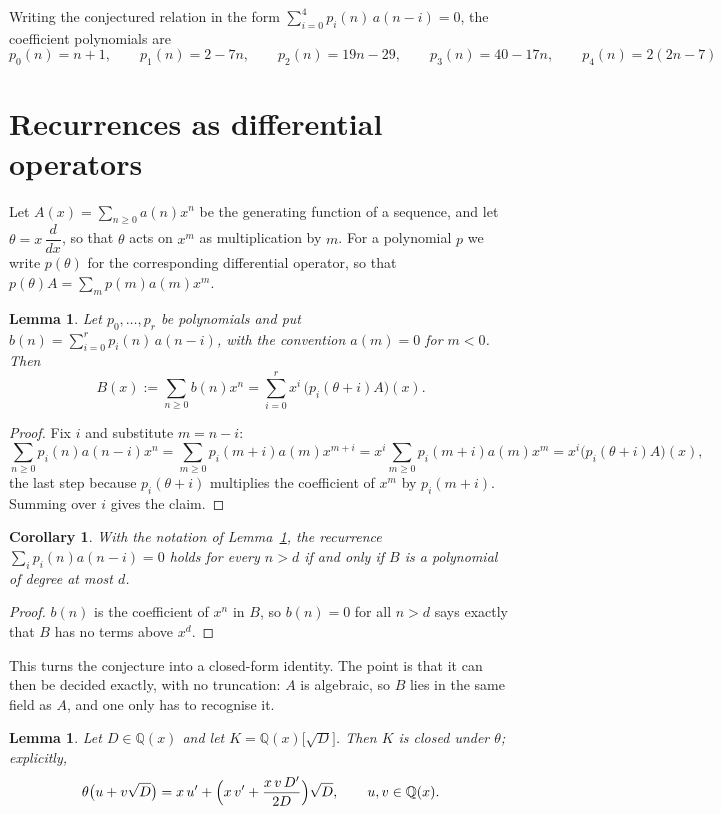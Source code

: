 \documentclass[11pt,a4paper]{article}
\theoremstyle{plain}
\newtheorem{lemma}[theorem]{Lemma}
\newtheorem{corollary}[theorem]{Corollary}
\theoremstyle{definition}
\begin{document}
Writing the conjectured relation in the form $\sum_{i=0}^{4}p_{i}(n)\,a(n-i)=0$,
the coefficient polynomials are
\[
p_{0}(n)=n + 1,\qquad p_{1}(n)=2 - 7 n,\qquad p_{2}(n)=19 n - 29,\qquad p_{3}(n)=40 - 17 n,\qquad p_{4}(n)=2 \left(2 n - 7\right)
\]

\section{Recurrences as differential operators}

Let $A(x)=\sum_{n\ge0}a(n)x^{n}$ be the generating function of a sequence, and let
$\theta=x\,\dfrac{d}{dx}$, so that $\theta$ acts on $x^{m}$ as multiplication by $m$. For a
polynomial $p$ we write $p(\theta)$ for the corresponding differential operator, so that
$p(\theta)A=\sum_{m}p(m)a(m)x^{m}$.

\begin{lemma}\label{lem:transfer}
Let $p_{0},\dots,p_{r}$ be polynomials and put $b(n)=\sum_{i=0}^{r}p_{i}(n)\,a(n-i)$, with
the convention $a(m)=0$ for $m<0$. Then
\[
B(x):=\sum_{n\ge0}b(n)x^{n}=\sum_{i=0}^{r}x^{i}\,\bigl(p_{i}(\theta+i)A\bigr)(x).
\]
\end{lemma}

\begin{proof}
Fix $i$ and substitute $m=n-i$:
\[
\sum_{n\ge0}p_{i}(n)a(n-i)x^{n}=\sum_{m\ge0}p_{i}(m+i)a(m)x^{m+i}
=x^{i}\sum_{m\ge0}p_{i}(m+i)a(m)x^{m}=x^{i}\bigl(p_{i}(\theta+i)A\bigr)(x),
\]
the last step because $p_{i}(\theta+i)$ multiplies the coefficient of $x^{m}$ by
$p_{i}(m+i)$. Summing over $i$ gives the claim.
\end{proof}

\begin{corollary}\label{cor:criterion}
With the notation of Lemma~\ref{lem:transfer}, the recurrence
$\sum_{i}p_{i}(n)a(n-i)=0$ holds for every $n>d$ if and only if $B$ is a polynomial of
degree at most $d$.
\end{corollary}

\begin{proof}
$b(n)$ is the coefficient of $x^{n}$ in $B$, so $b(n)=0$ for all $n>d$ says exactly that
$B$ has no terms above $x^{d}$.
\end{proof}

This turns the conjecture into a closed-form identity. The point is that it can then be
decided exactly, with no truncation: $A$ is algebraic, so $B$ lies in the same field as
$A$, and one only has to recognise it.

\begin{lemma}\label{lem:field}
Let $D\in\mathbb{Q}(x)$ and let $K=\mathbb{Q}(x)\bigl[\sqrt{D}\bigr]$. Then $K$ is closed
under $\theta$; explicitly,
\[
\theta\bigl(u+v\sqrt{D}\bigr)=x\,u'+\Bigl(x\,v'+\frac{x\,v\,D'}{2D}\Bigr)\sqrt{D},
\qquad u,v\in\mathbb{Q}(x).
\]
\end{lemma}
\end{document}
